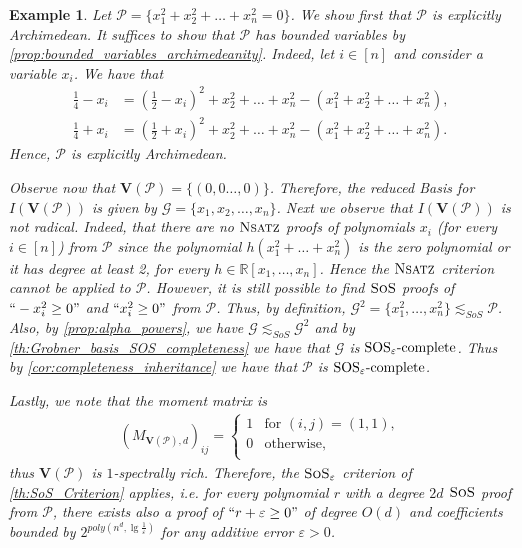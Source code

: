 \documentclass[11pt]{article}
\newcommand{\sos}{\text{\sc{SoS}}}
\newcommand{\Nsatz}{\textsc{Nsatz}}
\newcommand{\Variety}[1]{{\textbf{V}}\left( #1 \right)}
\newcommand{\1}{\textbf{1}}
\newcommand{\GB}{\text{Gr\"{o}bner} }
\newtheorem{example}[theorem]{Example}
\newcommand{\SOSe}{\rm{SOS}_\varepsilon\text{-complete}}
\begin{document}
\begin{example}\label{ex:separation2}
    Let $\mathcal{P} = \{ x_1^2 + x_2^2 + \ldots + x_n^2 =0\} $. We show first that $\mathcal{P}$ is explicitly Archimedean. It suffices to show that $\mathcal{P}$ has bounded variables by \cref{prop:bounded_variables_archimedeanity}. Indeed, let $i \in [n]$ and consider a variable $x_i$. We have that 
    \begin{align*}
        \frac{1}{4} - x_i &= \left(\frac{1}{2} - x_i\right)^2 + x_2^2 + \dots + x_n^2 - (x_1^2 + x_2^2 + \dots + x_n^2), \\
        \frac{1}{4} + x_i &= \left(\frac{1}{2} + x_i\right)^2 + x_2^2 + \dots + x_n^2 - (x_1^2 + x_2^2 + \dots + x_n^2).
    \end{align*}
    Hence, $\mathcal{P}$ is explicitly Archimedean.
    
     Observe now that $\Variety{\mathcal{P}} = \{(0,0 \ldots, 0)\}$. Therefore, the reduced \GB Basis for $I(\Variety{\mathcal{P}})$ is given by $\mathcal{G} = \{ x_1, x_2, \ldots, x_n \}$. Next we observe that $I(\Variety{\mathcal{P}})$ is not radical. Indeed, that there are no $\Nsatz$ proofs of polynomials $x_i$ (for every $i \in [n]$) from $\mathcal{P}$ since the polynomial $h(x_1^2 + \dots + x_n^2)$ is the zero polynomial or it has degree at least 2, for every $h\in \mathbb{R}[x_1, \dots, x_n]$. Hence the $\Nsatz$ criterion cannot be applied to $\mathcal{P}$. However, it is still possible to find $\sos$ proofs of $``-x_i^2 \geq 0"$ and $``x_i^2 \geq 0"$ from $\mathcal{P}$. Thus, by definition, $\mathcal{G}^2 = \{x_1^2, \dots, x_n^2\} \lesssim_{SoS} \mathcal{P}$. Also, by \cref{prop:alpha_powers}, we have  $\mathcal{G} \lesssim_{SoS} \mathcal{G}^2$ and by \cref{th:Grobner_basis_SOS_completeness} we have that $\mathcal{G}$ is $\SOSe$. Thus by \cref{cor:completeness_inheritance} we have that $\mathcal{P}$ is $\SOSe$.

    Lastly, we note that the moment matrix is
    \begin{align*}
        (M_{\Variety{\mathcal{P}},d})_{ij} = \begin{cases}
            1 & \text{for } (i,j) = (1,1), \\
            0 & \text{otherwise}, \\
        \end{cases}
    \end{align*}
    thus $\Variety{\mathcal{P}}$ is $1$-spectrally rich. Therefore, the $\sos_{\varepsilon}$ criterion of \cref{th:SoS_Criterion} applies, i.e. for every polynomial $r$ with a degree $2d$ $\sos$ proof from $\mathcal{P}$, there exists also a proof of $``r + \varepsilon \geq 0"$ of degree $O(d)$ and coefficients bounded by $2^ {poly(n^d,\lg \frac{1}{\varepsilon})}$ for any additive error $\varepsilon > 0$.
\end{example}
\end{document}
